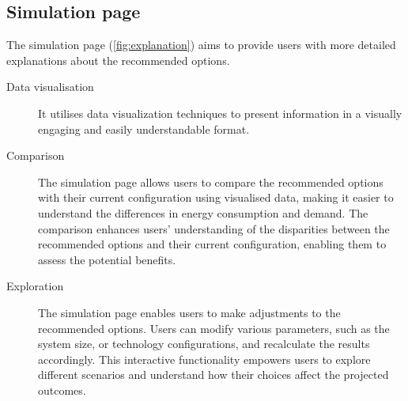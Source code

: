 \subsection*{Simulation page}

The simulation page (\ref{fig:explanation}) aims to provide users with more detailed explanations about the recommended options.
\begin{description}
  \item[Data visualisation] It utilises data visualization techniques to present information in a visually engaging and easily understandable format.
  \item[Comparison] The simulation page allows users to compare the recommended options with their current configuration using visualised data, making it easier to understand the differences in energy consumption and demand. 
    The comparison enhances users' understanding of the disparities between the recommended options and their current configuration, enabling them to assess the potential benefits. 
  \item[Exploration] The simulation page enables users to make adjustments to the recommended options. 
    Users can modify various parameters, such as the system size, or technology configurations, and recalculate the results accordingly. 
    This interactive functionality empowers users to explore different scenarios and understand how their choices affect the projected outcomes. 
\end{description}
